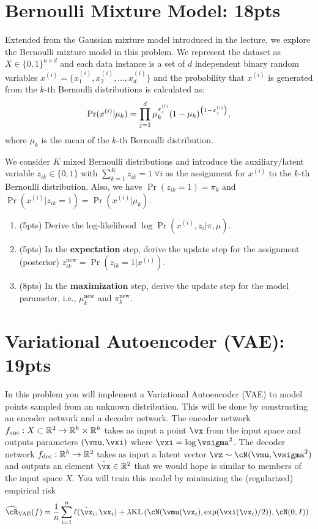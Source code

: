\documentclass[12pt]{article}
\def\hcR{\widehat{\cR}}
\begin{document}
\section{Bernoulli Mixture Model: 18pts}
Extended from the Gaussian mixture model introduced in the lecture, we explore the Bernoulli mixture model in this problem. We represent the dataset as $X \in \{0,1\}^{n\times d}$ and each data instance is a set of $d$ independent binary random variables $x^{(i)} = \{x^{(i)}_1, x^{(i)}_2, ..., x^{(i)}_d\}$ and the probability that $x^{(i)}$ is generated from the $k$-th Bernoulli distributions is calculated as:
\begin{align}
    \Pr(x^{(i)}|\mu_k) = \prod_{j=1}^d \mu_k^{x^{(i)}_j}(1-\mu_k)^{\left(1-x^{(i)}_j\right)} ,\notag
\end{align}
where $\mu_k$ is the mean of the $k$-th Bernoulli distribution.

We consider $K$ mixed Bernoulli distributions and introduce the auxiliary/latent variable $z_{ik} \in \{0,1\}$ with $\sum_{k=1}^K z_{ik} = 1 \ \forall i$ as the assignment for $x^{(i)}$ to the $k$-th Bernoulli distribution. Also, we have $\Pr(z_{ik} = 1) = \pi_k$ and $\Pr(x^{(i)}|z_{ik} = 1) = \Pr(x^{(i)}|\mu_k)$.

\begin{enumerate}
    \item (5pts) Derive the log-likelihood $\log \Pr(x^{(i)}, z_i| \pi, \mu)$.

    \item (5pts) In the \textbf{expectation} step, derive the update step for the assignment (posterior) $z_{ik}^{\text{new}} = \Pr(z_{ik} = 1|x^{(i)})$.

    \item (8pts) In the \textbf{maximization} step, derive the update step for the model parameter, i.e., $\mu_k^{\text{new}}$ and $\pi_k^{\text{new}}$.

\end{enumerate}

\section{Variational Autoencoder (VAE): 19pts}
  
In this problem you will implement a Variational Autoencoder (VAE) to model points sampled from an unknown distribution.  This will be done by constructing an encoder network and a decoder network.  The encoder network $f_{\textup{enc}} : X \subset \mathbb{R}^2 \to \mathbb{R}^h \times \mathbb{R}^h$ takes as input a point $\vx$ from the input space and outputs parameters $(\vmu, \vxi)$ where $\vxi =  \log  \vsigma^2$. The decoder network $f_{\textup{dec}} : \mathbb{R}^h \to \mathbb{R}^2$ takes as input a latent vector $\vz \sim \cN(\vmu, \vsigma^2)$ and outputs an element $\hat{\vx} \in \mathbb{R}^2$ that we would hope is similar to members of the input space $X$. You will train this model by minimizing the (regularized) empirical risk
\begin{align*}
 \hcR_{\textup{VAE}} (f) =  \frac{1}{n}\sum_{i=1}^n \ell ( \hat \vx_i , \vx_i) + \lambda \textup{KL}\left(\cN(\vmu(\vx_i), \exp(\vxi(\vx_i)/2)), \cN(0, I)\right).
\end{align*}
\end{document}

